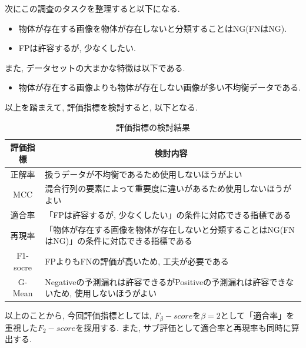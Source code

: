 \documentclass[dvipdfmx]{jsarticle}
\begin{document}
次にこの調査のタスクを整理すると以下になる.

\begin{itemize}
    \item 物体が存在する画像を物体が存在しないと分類することはNG(FNはNG).
    \item FPは許容するが, 少なくしたい.
\end{itemize}

また, データセットの大まかな特徴は以下である.
\begin{itemize}
    \item 物体が存在する画像よりも物体が存在しない画像が多い不均衡データである.
\end{itemize}

以上を踏まえて, 評価指標を検討すると, 以下となる.


\begin{table}[H]
    \centering
    \begin{tabular}{|c|p{12cm}|}
        \hline
        \textbf{評価指標} & \multicolumn{1}{c|}{\textbf{検討内容}}\\
        \hline 
        
        正解率 & 扱うデータが不均衡であるため使用しないほうがよい\\
        \hline
        
        MCC & 混合行列の要素によって重要度に違いがあるため使用しないほうがよい\\
        \hline
        
        適合率 & 「FPは許容するが, 少なくしたい」の条件に対応できる指標である\\
        \hline
        
        再現率 & 「物体が存在する画像を物体が存在しないと分類することはNG(FNはNG)」の条件に対応できる指標である\\
        \hline
        
        F1-socre & FPよりもFNの評価が高いため, 工夫が必要である\\
        \hline

        G-Mean & Negativeの予測漏れは許容できるがPositiveの予測漏れは許容できないため, 使用しないほうがよい\\
        \hline
        
    \end{tabular}
    \caption{評価指標の検討結果}
    \label{cost}
\end{table}

以上のことから, 今回評価指標としては, 
$F_{\beta}-score$を${\beta}=2$として「適合率」を重視した$F_{2}-score$を採用する.
また, サブ評価として適合率と再現率も同時に算出する.
\end{document}
